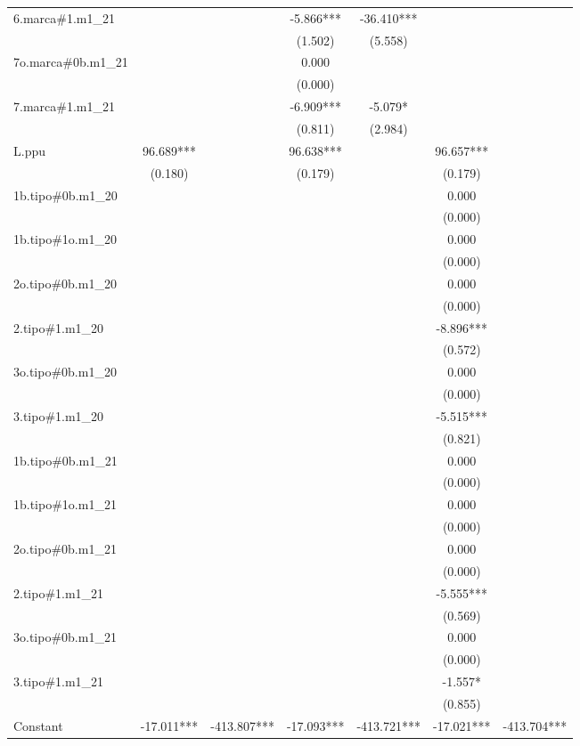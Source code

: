 \begin{tabular}{lcccccc}
6.marca\#1.m1\_21 &  &  & -5.866*** & -36.410*** &  &  \\
 &  &  & (1.502) & (5.558) &  &  \\
7o.marca\#0b.m1\_21 &  &  & 0.000 &  &  &  \\
 &  &  & (0.000) &  &  &  \\
7.marca\#1.m1\_21 &  &  & -6.909*** & -5.079* &  &  \\
 &  &  & (0.811) & (2.984) &  &  \\
L.ppu & 96.689*** &  & 96.638*** &  & 96.657*** &  \\
 & (0.180) &  & (0.179) &  & (0.179) &  \\
1b.tipo\#0b.m1\_20 &  &  &  &  & 0.000 &  \\
 &  &  &  &  & (0.000) &  \\
1b.tipo\#1o.m1\_20 &  &  &  &  & 0.000 &  \\
 &  &  &  &  & (0.000) &  \\
2o.tipo\#0b.m1\_20 &  &  &  &  & 0.000 &  \\
 &  &  &  &  & (0.000) &  \\
2.tipo\#1.m1\_20 &  &  &  &  & -8.896*** &  \\
 &  &  &  &  & (0.572) &  \\
3o.tipo\#0b.m1\_20 &  &  &  &  & 0.000 &  \\
 &  &  &  &  & (0.000) &  \\
3.tipo\#1.m1\_20 &  &  &  &  & -5.515*** &  \\
 &  &  &  &  & (0.821) &  \\
1b.tipo\#0b.m1\_21 &  &  &  &  & 0.000 &  \\
 &  &  &  &  & (0.000) &  \\
1b.tipo\#1o.m1\_21 &  &  &  &  & 0.000 &  \\
 &  &  &  &  & (0.000) &  \\
2o.tipo\#0b.m1\_21 &  &  &  &  & 0.000 &  \\
 &  &  &  &  & (0.000) &  \\
2.tipo\#1.m1\_21 &  &  &  &  & -5.555*** &  \\
 &  &  &  &  & (0.569) &  \\
3o.tipo\#0b.m1\_21 &  &  &  &  & 0.000 &  \\
 &  &  &  &  & (0.000) &  \\
3.tipo\#1.m1\_21 &  &  &  &  & -1.557* &  \\
 &  &  &  &  & (0.855) &  \\
Constant & -17.011*** & -413.807*** & -17.093*** & -413.721*** & -17.021*** & -413.704*** \\

\end{tabular}
